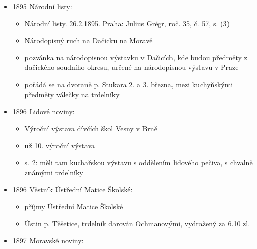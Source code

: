 \begin{itemize}
  \begin{itemize}
  \tightlist
  \item
    povídka Dárek k Ježíšku, Josef Kořínek
  \item
    kluk na Slovácku se dvoří dívce, padají takové hubičky sladké, že by
    mohli ocukrovat košatinu trdelníků
  \item
    jsem si jistej, že stejnou povídku už jsem viděl jinde
  \end{itemize}
\item
  1895
  \href{https://www.digitalniknihovna.cz/svkhk/uuid/uuid:f378270b-435d-11dd-b505-00145e5790ea}{Národní
  listy}:

  \begin{itemize}
  \tightlist
  \item
    Národní listy. 26.2.1895. Praha: Julius Grégr, roč. 35, č. 57, s.
    (3)
  \item
    Národopisný ruch na Dačicku na Moravě
  \item
    pozvánka na národopisnou výstavku v Dačicích, kde budou předměty z
    dačického soudního okresu, určené na národopisnou výstavu v Praze
  \item
    pořádá se na dvoraně p. Stukara 2. a 3. března, mezi kuchyňskými
    předměty válečky na trdelníky
  \end{itemize}
\item
  1896
  \href{https://ceskadigitalniknihovna.cz/uuid/uuid:b805f3a6-435d-11dd-b505-00145e5790ea}{Lidové
  noviny}:

  \begin{itemize}
  \tightlist
  \item
    Výroční výstava dívčích škol Vesny v Brně
  \item
    už 10. výroční výstava
  \item
    s. 2: měli tam kuchařskou výstavu s oddělením lidového pečiva, s
    chvalně známými trdelníky
  \end{itemize}
\item
  1896
  \href{https://ceskadigitalniknihovna.cz/uuid/uuid:77d41380-a2e4-11e7-a093-005056825209}{Věstník
  Ústřední Matice Školské}:

  \begin{itemize}
  \tightlist
  \item
    příjmy Ústřední Matice Školské
  \item
    Ústin p. Těšetice, trdelník darován Ochmanovými, vydražený za 6.10
    zl.
  \end{itemize}
\item
  1897
  \href{https://www.digitalniknihovna.cz/vkol/uuid/uuid:1a1f3964-02ac-463e-8a5b-8d7577a0ad33}{Moravské
  noviny}:


\end{itemize}
